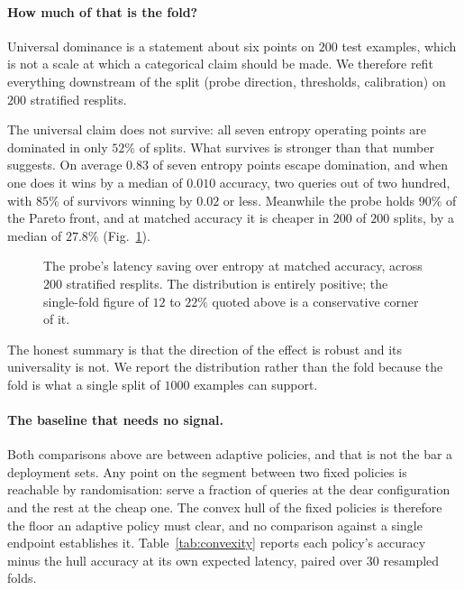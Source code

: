\documentclass[10pt,twocolumn]{article}
\theoremstyle{plain}
\begin{document}
\paragraph{How much of that is the fold?} Universal dominance is a statement
about six points on $200$ test examples, which is not a scale at which a
categorical claim should be made. We therefore refit everything
downstream of the split (probe direction, thresholds, calibration) on $200$
stratified resplits.

The universal claim does not survive: all seven entropy operating points are
dominated in only $52\%$ of splits. What survives is stronger than that number
suggests. On average $0.83$ of seven entropy points escape domination, and when
one does it wins by a median of $0.010$ accuracy, two queries out of two hundred, with $85\%$ of survivors winning by $0.02$ or less. Meanwhile the
probe holds $90\%$ of the Pareto front, and at matched accuracy it is cheaper
in $200$ of $200$ splits, by a median of $27.8\%$ (Fig.~\ref{fig:resplit}).

\begin{figure}[t]
\centering
{}
\caption{The probe's latency saving over entropy at matched accuracy, across
$200$ stratified resplits. The distribution is entirely positive; the
single-fold figure of $12$ to $22\%$ quoted above is a conservative corner of
it.}
\label{fig:resplit}
\end{figure}

The honest summary is that the direction of the effect is robust and its
universality is not. We report the distribution rather than the fold because the
fold is what a single split of $1000$ examples can support.

\paragraph{The baseline that needs no signal.} Both comparisons above are
between adaptive policies, and that is not the bar a deployment sets. Any point
on the segment between two fixed policies is reachable by randomisation: serve a
fraction of queries at the dear configuration and the rest at the cheap one. The
convex hull of the fixed policies is therefore the floor an adaptive policy must
clear, and no comparison against a single endpoint establishes it.
Table~\ref{tab:convexity} reports each policy's accuracy minus the hull
accuracy at its own expected latency, paired over $30$ resampled folds.
\end{document}

